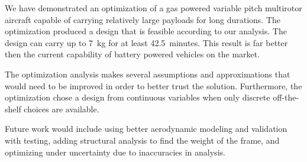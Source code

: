 \documentclass[letterpaper, 10 pt, conference]{ieeeconf}  %
\begin{document}
We have demonstrated an optimization of a gas powered variable pitch multirotor aircraft capable of carrying relatively large payloads for long durations.  The optimization produced a design that is feasible according to our analysis.  The design can carry up to 7~kg for at least 42.5~minutes.  This result is far better then the current capability of battery powered vehicles on the market.

The optimization analysis makes several assumptions and approximations that would need to be improved in order to better trust the solution.  Furthermore, the optimization chose a design from continuous variables when only discrete off-the-shelf choices are available. 

Future work would include using better aerodynamic modeling and validation with testing, adding structural analysis to find the weight of the frame, and optimizing under uncertainty due to inaccuracies in analysis. 









\end{document}
